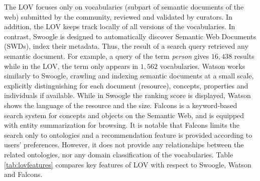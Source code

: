 \documentclass{iosart2c}
\begin{document}
The LOV focuses only on vocabularies (subpart of semantic documents of the web) submitted by the community, reviewed and validated by curators. In addition, the LOV keeps track locally of all versions of the vocabularies.  In contrast, Swoogle is designed to automatically discover Semantic Web Documents (SWDs), index their metadata. Thus, the result of a search query retrieved any semantic document. For example, a query of the term \textit{person} gives $16,438$ results while in the LOV, the term only appears in $1,562$ vocabularies.
Watson works similarly to Swoogle, crawling and indexing semantic documents at a small scale, explicitly distinguishing for each document (resource), concepts, properties and individuals if available. While in Swoogle  the ranking score is displayed, Watson shows the language of the resource and the size. Falcons is a keyword-based search system for concepts and objects on the Semantic Web, and is equipped with entity summarization for browsing. It is notable that Falcons limits the search only to ontologies and a recommendation feature is provided according to users' preferences. However, it does not provide any relationships between the related ontologies, nor any domain classification of the vocabularies.
Table \ref{tab:lovfeatures} compares key features of LOV with respect to Swoogle, Watson and Falcons.
 \begin{table}[!htb]
\end{table}
\end{document}

